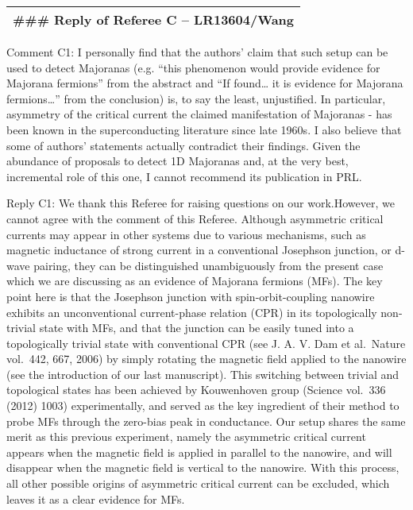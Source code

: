 \documentclass[11pt]{article}
\begin{document}
\begin{longtable}[]{@{}l@{}}
\toprule
\endhead
\#\#\# Reply of Referee C -- LR13604/Wang\tabularnewline
\bottomrule
\end{longtable}

Comment C1: I personally find that the authors' claim that such setup
can be used to detect Majoranas (e.g. ``this phenomenon would provide
evidence for Majorana fermions'' from the abstract and ``If
found\ldots{} it is evidence for Majorana fermions\ldots{}'' from the
conclusion) is, to say the least, unjustified. In particular, asymmetry
of the critical current the claimed manifestation of Majoranas - has
been known in the superconducting literature since late 1960s. I also
believe that some of authors' statements actually contradict their
findings. Given the abundance of proposals to detect 1D Majoranas and,
at the very best, incremental role of this one, I cannot recommend its
publication in PRL.

Reply C1: We thank this Referee for raising questions on our
work.However, we cannot agree with the comment of this Referee. Although
asymmetric critical currents may appear in other systems due to various
mechanisms, such as magnetic inductance of strong current in a
conventional Josephson junction, or d-wave pairing, they can be
distinguished unambiguously from the present case which we are
discussing as an evidence of Majorana fermions (MFs). The key point here
is that the Josephson junction with spin-orbit-coupling nanowire
exhibits an unconventional current-phase relation (CPR) in its
topologically non-trivial state with MFs, and that the junction can be
easily tuned into a topologically trivial state with conventional CPR
(see J. A. V. Dam et al.~Nature vol.~442, 667, 2006) by simply rotating
the magnetic field applied to the nanowire (see the introduction of our
last manuscript). This switching between trivial and topological states
has been achieved by Kouwenhoven group (Science vol.~336 (2012) 1003)
experimentally, and served as the key ingredient of their method to
probe MFs through the zero-bias peak in conductance. Our setup shares
the same merit as this previous experiment, namely the asymmetric
critical current appears when the magnetic field is applied in parallel
to the nanowire, and will disappear when the magnetic field is vertical
to the nanowire. With this process, all other possible origins of
asymmetric critical current can be excluded, which leaves it as a clear
evidence for MFs.
\end{document}
